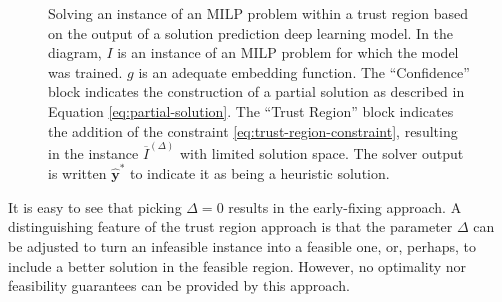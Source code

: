\begin{figure}[h]
    \centering
    \caption{Solving an instance of an MILP problem within a trust region based on the output of a solution prediction deep learning model. In the diagram,  $I$ is an instance of an MILP problem for which the model was trained. $g$ is an adequate embedding function. The ``Confidence'' block indicates the construction of a partial solution as described in Equation \eqref{eq:partial-solution}. The ``Trust Region'' block indicates the addition of the constraint \eqref{eq:trust-region-constraint}, resulting in the instance $\overline{I}^{(\Delta)}$ with limited solution space. The solver output is written $\hat{\bm{y}}^*$ to indicate it as being a heuristic solution.}
    \label{fig:trust-region-diagram}
\end{figure}

It is easy to see that picking $\Delta=0$ results in the early-fixing approach.
A distinguishing feature of the trust region approach is that the parameter $\Delta$ can be adjusted to turn an infeasible instance into a feasible one, or, perhaps, to include a better solution in the feasible region.
However, no optimality nor feasibility guarantees can be provided by this approach.

